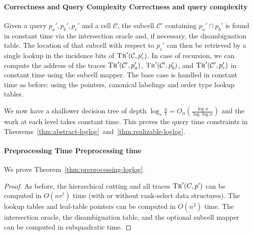 \paragraph*{\iftitlecase%
Correctness and Query Complexity\else%
Correctness and query complexity\fi}
Given a query \(p_a', p_b', p_c'\) and a cell \(\mathcal{C}\),
the subcell \(\mathcal{C}'\) containing \(p_a' \cap p_b'\) is found in constant
time via the
intersection oracle and, if necessary, the disambiguation table.
The location of that subcell with respect to \(p_c'\) can then be retrieved by
a single lookup in the incidence bits of \(\textsc{Tr}'(\mathcal{C}, p_c')\).
In case of recursion, we can compute the address of the traces
\(\textsc{Tr}'(\mathcal{C}', p_a')\),
\(\textsc{Tr}'(\mathcal{C}', p_b')\), and
\(\textsc{Tr}'(\mathcal{C}', p_c')\) in constant time using the subcell mapper.
The base case is handled in constant time as before: using the pointers,
canonical labelings and order type lookup tables.

We now have a shallower decision tree of depth
\(\log_r{\frac{n}{t}} = O_\alpha(\frac{\log{n}}{\log{\log{n}}})\)
and the work at each level takes constant time.
This proves the query time constraints in
Theorems~\ref{thm:abstract-loglog}~and~\ref{thm:realizable-loglog}.

\paragraph*{\iftitlecase%
Preprocessing Time\else%
Preprocessing time\fi}
We prove Theorem~\ref{thm:preprocessing-loglog}.
\begin{proof}
  As before, the hierarchical cutting and all traces \(\textsc{Tr}'(C, p')\)
  can be computed in \(O(nr^\ell)\) time (with or without rank-select data
  structures). The lookup tables and leaf-table pointers can be computed in
  \(O(n^2)\) time. The intersection oracle, the disambiguation table, and the
  optional subcell mapper can be computed in subquadratic time.
\end{proof}
